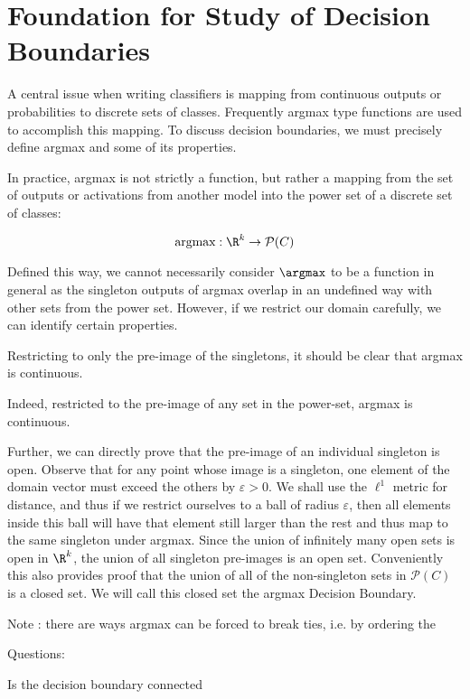 \chapter{Foundation for Study of Decision Boundaries} 
\label{Chapter3a}

A central issue when writing classifiers is mapping from continuous outputs or probabilities to discrete sets of classes. Frequently argmax type functions are used to accomplish this mapping. To discuss decision boundaries, we must precisely define argmax and some of its properties. 

In practice, argmax is not strictly a function, but rather a mapping from the set of outputs or activations from another model into the power set of a discrete set of classes:

\begin{equation}
    \text{argmax} : \R^k \to \mathcal{P}(C)
\end{equation}

Defined this way, we cannot necessarily consider $\argmax$ to be a function in general as the singleton outputs of argmax overlap in an undefined way with other sets from the power set. However, if we restrict our domain carefully, we can identify certain properties. 

Restricting to only the pre-image of the singletons, it should be clear that argmax is continuous. 

Indeed, restricted to the pre-image of any set in the power-set, argmax is continuous. 

Further, we can directly prove that the pre-image of an individual singleton is open. Observe that for any point whose image is a singleton, one element of the domain vector must exceed the others by $\varepsilon > 0$. We shall use the $\ell^1$ metric for distance, and thus if we restrict ourselves to a ball of radius $\varepsilon$, then all elements inside this ball will have that element still larger than the rest and thus map to the same singleton under argmax. Since the union of infinitely many open sets is open in $\R^k$, the union of all singleton pre-images is an open set. Conveniently this also provides proof that the union of all of the non-singleton sets in $\mathcal{P}(C)$ is a closed set. We will call this closed set the argmax Decision Boundary. 

Note : there are ways argmax can be forced to break ties, i.e. by ordering the 

Questions:

Is the decision boundary connected


